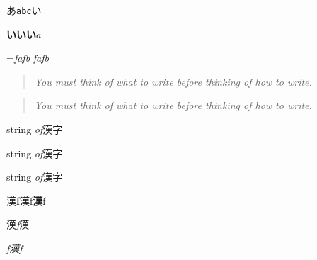 \documentclass{article}
\begin{document}
あ\texttt{abc}い\par
\textbf{いいい}$a$\par

=\hbox{\textit{f\textup{af}b}}
\hbox{\textit{f\/\textup{af}b}} %

\begin{quote}\itshape
You must think of \emph{what} to write
before thinking of \emph{how} to write.
\end{quote}
\begin{quote}\itshape %
You must think of\/ \emph{what} to write
before thinking of\/ \emph{how} to write.
\end{quote}

string \textit{of}漢字\par
string {\itshape of\/}漢字\par
string {\itshape of}漢字\par %

漢\textbf{f}漢f\textbf{漢}f\par
漢\textit{f}漢\par
\textit{f\/\textup{漢}f}\par
\end{document}
